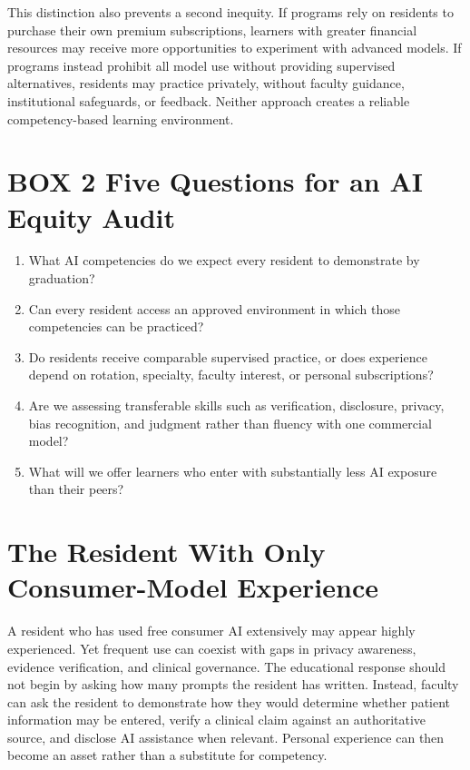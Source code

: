 \documentclass[12pt]{article}
\begin{document}
This distinction also prevents a second inequity. If programs rely on residents
to purchase their own premium subscriptions, learners with greater financial
resources may receive more opportunities to experiment with advanced models.
If programs instead prohibit all model use without providing supervised
alternatives, residents may practice privately, without faculty guidance,
institutional safeguards, or feedback. Neither approach creates a reliable
competency-based learning environment.

\section*{BOX 2 \quad Five Questions for an AI Equity Audit}

\begin{enumerate}
  \item What AI competencies do we expect every resident to demonstrate by
        graduation?
  \item Can every resident access an approved environment in which those
        competencies can be practiced?
  \item Do residents receive comparable supervised practice, or does experience
        depend on rotation, specialty, faculty interest, or personal
        subscriptions?
  \item Are we assessing transferable skills such as verification, disclosure,
        privacy, bias recognition, and judgment rather than fluency with one
        commercial model?
  \item What will we offer learners who enter with substantially less AI
        exposure than their peers?
\end{enumerate}

\section*{The Resident With Only Consumer-Model Experience}

A resident who has used free consumer AI extensively may appear highly
experienced. Yet frequent use can coexist with gaps in privacy awareness,
evidence verification, and clinical governance. The educational response
should not begin by asking how many prompts the resident has written. Instead,
faculty can ask the resident to demonstrate how they would determine whether
patient information may be entered, verify a clinical claim against an
authoritative source, and disclose AI assistance when relevant. Personal
experience can then become an asset rather than a substitute for competency.
\end{document}
